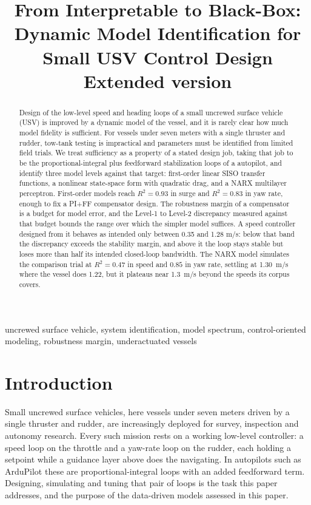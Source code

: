 \documentclass[conference]{IEEEtran}
\title{From Interpretable to Black-Box: Dynamic Model Identification
for Small USV Control Design\\[2pt]
\large\normalfont Extended version}
\author{
  \IEEEauthorblockN{Brian S. Bingham and Carson Vogt}
  \IEEEauthorblockA{
    Department of Mechanical and Aerospace Engineering\\
    Naval Postgraduate School\\
    Monterey, CA, USA\\
    bbingham@nps.edu, crvogt@nps.edu
  }
}
\begin{document}
\maketitle

\begin{abstract}
Design of the low-level speed and heading loops of a small uncrewed surface vehicle (USV) is improved by a dynamic model of the vessel, and it is rarely clear how much model fidelity is sufficient. For vessels under seven meters with a single thruster and rudder, tow-tank testing is impractical and parameters must be identified from limited field trials. We treat sufficiency as a property of a stated design job, taking that job to be the proportional-integral plus feedforward stabilization loops of a  autopilot, and identify three model levels against that target: first-order linear SISO transfer functions, a nonlinear state-space form with quadratic drag, and a NARX multilayer perceptron. First-order models reach $R^2=0.93$ in surge and $R^2=0.83$ in yaw rate, enough to fix a PI+FF compensator design. The robustness margin of a compensator is a budget for model error, and the Level-1 to Level-2 discrepancy measured against that budget bounds the range over which the simpler model suffices. A speed controller designed from it behaves as intended only between 0.35 and 1.28 m/s: below that band the discrepancy exceeds the stability margin, and above it the loop stays stable but loses more than half its intended closed-loop bandwidth. The NARX model simulates the comparison trial at $R^2=0.47$ in speed and $0.85$ in yaw rate, settling at 1.30~m/s where the vessel does 1.22, but it plateaus near 1.3~m/s beyond the speeds its corpus covers. 
\end{abstract}

\begin{IEEEkeywords}
uncrewed surface vehicle, system identification, model spectrum, control-oriented
modeling, robustness margin, underactuated vessels
\end{IEEEkeywords}

\section{Introduction}
\label{sec:intro}

Small uncrewed surface vehicles, here vessels under seven meters driven by a single thruster and rudder, are increasingly deployed for survey, inspection and autonomy research. Every such mission rests on a working low-level controller: a speed loop on the throttle and a yaw-rate loop on the rudder, each holding a setpoint while a guidance layer above does the navigating. In autopilots such as ArduPilot these are proportional-integral loops with an added feedforward term. Designing, simulating and tuning that pair of loops is the task this paper addresses, and the purpose of the data-driven models assessed in this paper.  
\end{document}
